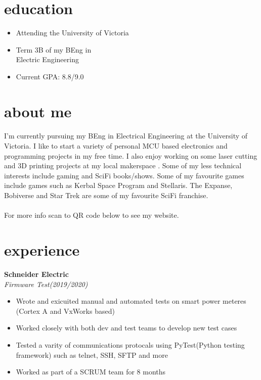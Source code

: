 \documentclass{article}
\newcommand{\minicolumns}[2]{
  \begin{minipage}[t]{0.25\textwidth}
    \begin{flushright}
      #1
    \end{flushright}
  \end{minipage}
  \hfill
  \begin{minipage}[t]{0.7\textwidth}
    #2
  \end{minipage}
}
\newcommand{\resumeSection}[3]{
  \minicolumns{
      \textbf{#1}\\
      \textit{#2}
    }
    {
      \begin{itemize}[leftmargin=*]
          \justifying
          \setlength\itemsep{-0.1em}
          #3
      \end{itemize}
  }
  \vspace{0.5\baselineskip}
}
\begin{document}
\begin{minipage}[t]{0.34\textwidth}
  \section{education}
  \begin{itemize}[leftmargin=*]
    \setlength\itemsep{-0.1em}
    \item Attending the University of Victoria
    \item Term 3B of my BEng in\\ Electric Engineering
    \item Current GPA: 8.8/9.0
  \end{itemize}

  \section{about me}
  \paragraph{}
  \raggedright
  I'm currently pursuing my BEng in Electrical Engineering at the University of Victoria. I like to start a variety of personal MCU based electronics and programming projects in my free time.  I also enjoy working on some laser cutting and 3D printing projects at my local makerspace . Some of my less technical interests include gaming and SciFi books/shows. Some of my favourite games include games such as Kerbal Space Program and Stellaris. The Expanse, Bobiverse and Star Trek are some of my favourite SciFi franchise.
  \paragraph{}
  For more info scan to QR code below to see my website.

  \vspace*{3em}
  \centering



\end{minipage}

\section{experience}
\resumeSection{Schneider Electric}{Firmware Test(2019/2020)}{
  \item Wrote and exicuited manual and automated tests on smart power meteres (Cortex A and VxWorks based)
  \item Worked closely with both dev and test teams to develop new test cases
  \item Tested a varity of communications protocals using PyTest(Python testing framework) such as telnet, SSH, SFTP and more
  \item Worked as part of a SCRUM team for 8 months
}
\end{document}

